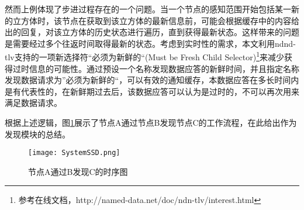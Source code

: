 \par
然而上例体现了步进过程存在的一个问题。当一个节点的感知范围开始包括某一新的立方体时，该节点在获取到该立方体的最新信息前，可能会根据缓存中的内容给出的回复，对该立方体的历史状态进行遍历，直到获得最新状态。这样带来的问题是需要经过多个往返时间取得最新的状态。考虑到实时性的需求，本文利用ndnd-tlv支持的一项新选择符“必须为新鲜的“(Must be Fresh Child Selector)\footnote{参考在线文档，http://named-data.net/doc/ndn-tlv/interest.html}来减少获得过时信息的可能性。通过预设一个名称发现数据应答的新鲜时间，并且指定名称发现数据请求为”必须为新鲜的“，可以有效的通知缓存，本数据应答在多长时间内是有代表性的，在新鲜期过去后，该数据应答可以认为是过时的，不可以再次用来满足数据请求。
\par
根据上述逻辑，图\ref{fig:DesignSSD}展示了节点A通过节点B发现节点C的工作流程，在此给出作为发现模块的总结。
\begin{figure}[h!]
	\centering
	\texttt{[image: SystemSSD.png]}
	\caption{节点A通过B发现C的时序图}
	\label{fig:DesignSSD}
\end{figure}
